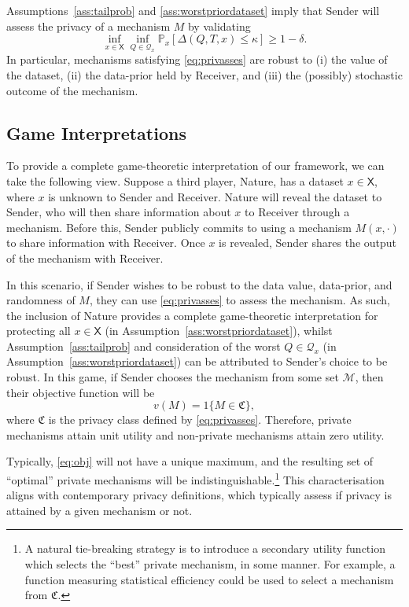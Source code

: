 \documentclass{article}
\theoremstyle{plain}
\theoremstyle{plain}
\theoremstyle{definition}
\theoremstyle{remark}
\theoremstyle{plain}
\newcommand{\xtrue}{x}
\renewcommand{\Pr}{\mathbb{P}}
\newcommand{\PrMx}{\Pr_{x}}
\newcommand{\xset}{\mathsf{X}}
\begin{document}
Assumptions~\ref{ass:tailprob} and \ref{ass:worstpriordataset} imply that Sender will assess the privacy of a mechanism $M$ by validating
\begin{equation}\label{eq:privasses}
    \inf_{x \in \xset}\inf_{Q \in \mathcal{Q}_x}\PrMx\left[\Delta(Q,T,x) \leq \kappa \right] \geq 1 - \delta.
\end{equation}
In particular, mechanisms satisfying \eqref{eq:privasses} are robust to (i) the value of the dataset, (ii) the data-prior held by Receiver, and (iii) the (possibly) stochastic outcome of the mechanism.

\subsection{Game Interpretations}\label{sec:game}
To provide a complete game-theoretic interpretation of our framework, we can take the following view. Suppose a third player, Nature, has a dataset $\xtrue \in \xset$, where $\xtrue$ is unknown to Sender and Receiver. Nature will reveal the dataset to Sender, who will then share information about $x$ to Receiver through a mechanism. Before this, Sender publicly commits to using a mechanism $M(x,\cdot)$ to share information with Receiver. Once $\xtrue$ is revealed, Sender shares the output of the mechanism with Receiver. 

In this scenario, if Sender wishes to be robust to the data value, data-prior, and randomness of $M$, they can use \eqref{eq:privasses} to assess the mechanism. As such, the inclusion of Nature provides a complete game-theoretic interpretation for protecting all $x\in \xset$ (in Assumption~\ref{ass:worstpriordataset}), whilst Assumption~\ref{ass:tailprob} and consideration of the worst $Q\in\mathcal{Q}_x$ (in Assumption~\ref{ass:worstpriordataset}) can be attributed to Sender's choice to be robust. In this game, if Sender chooses the mechanism from some set $\mathcal{M}$, then their objective function will be
\begin{equation}\label{eq:obj}
    v(M) = 1\{M \in \mathfrak{C}\},
\end{equation}
where $\mathfrak{C}$ is the privacy class defined by
\eqref{eq:privasses}. Therefore, private mechanisms attain unit utility and non-private mechanisms attain zero utility.

Typically, \eqref{eq:obj} will not have a unique maximum, and the resulting set of ``optimal'' private mechanisms will be indistinguishable.\footnote{A natural tie-breaking strategy is to introduce a secondary utility function which selects the ``best'' private mechanism, in some manner. For example, a function measuring statistical efficiency could be used to select a mechanism from $\mathfrak{C}$.}  This characterisation aligns with contemporary privacy definitions, which typically assess if privacy is attained by a given mechanism or not.
\end{document}
